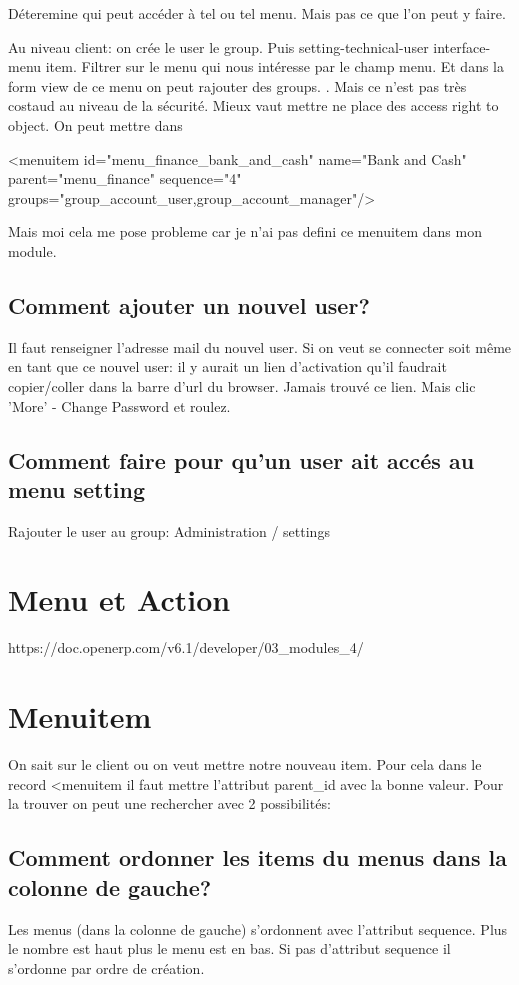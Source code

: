 \documentclass[12pt,a4paper]{article}
\begin{document}
Déteremine qui peut accéder à tel ou tel menu. Mais pas ce que l'on peut y faire. 

Au niveau client: on crée le user le group. Puis setting-technical-user interface-menu item. Filtrer sur le menu qui nous intéresse par le champ menu. Et dans la form view de ce menu on peut rajouter des groups. . Mais ce n'est pas très costaud au niveau de la sécurité. Mieux vaut mettre ne place des access right to object.
On peut mettre dans 

<menuitem id="menu\_finance\_bank\_and\_cash" name="Bank and Cash" parent="menu\_finance" sequence="4"
            groups="group\_account\_user,group\_account\_manager"/>

Mais moi cela me pose probleme car je n'ai pas defini ce menuitem dans mon module.


\subsection{Comment ajouter un nouvel user?}
\label{sec:new_user}

Il faut renseigner l'adresse mail  du nouvel user. 
Si on veut se connecter soit même en tant que ce nouvel user: il y aurait un lien d'activation qu'il faudrait copier/coller dans la barre d'url du browser. Jamais trouvé ce lien.
Mais clic 'More' - Change Password et roulez. 

\subsection{Comment faire pour qu'un user ait accés au menu setting}
\label{sec:menu_setting}

Rajouter le user au group: Administration / settings


\section{Menu et Action}
\label{sec:menu}

https://doc.openerp.com/v6.1/developer/03\_modules\_4/
\section{Menuitem}
\label{menuitem}
On sait sur le client ou on veut mettre notre nouveau item. Pour cela dans le
record <menuitem il faut mettre l'attribut parent\_id avec la bonne valeur. Pour
la trouver on peut une rechercher avec 2 possibilités:


\subsection{ Comment ordonner les items du menus dans la colonne de gauche?}
\label{sec:itemorder}
Les menus (dans la colonne de gauche) s’ordonnent avec l’attribut sequence. Plus le nombre est haut plus le menu est en bas. Si pas
d’attribut sequence il s’ordonne par ordre de création.
\end{document}
